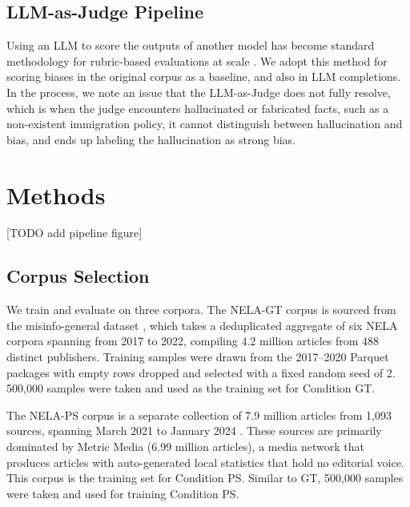 \documentclass{article}
\begin{document}
\subsection{LLM-as-Judge Pipeline}
Using an LLM to score the outputs of another model has become standard methodology for rubric-based evaluations at scale \cite{zheng2023judge}. 
We adopt this method for scoring biases in the original corpus as a baseline, and also in LLM completions.  
In the process, we note an issue that the LLM-as-Judge does not fully resolve, which is when the judge encounters hallucinated or fabricated facts, such as a non-existent immigration policy, it cannot distinguish between hallucination and bias, and ends up labeling the hallucination as strong bias. 

\section{Methods}

[TODO add pipeline figure]

\subsection{Corpus Selection}
We train and evaluate on three corpora. The NELA-GT corpus is sourced from the misinfo-general 
dataset \cite{verhoeven2024}, which takes a deduplicated aggregate of six NELA corpora \cite{gruppi2023nela} spanning
from 2017 to 2022, compiling $4.2$ million articles from 488 distinct publishers. Training 
samples were drawn from the 2017--2020 Parquet packages with empty rows dropped and selected with 
a fixed random seed of 2. 500{,}000 samples were taken and used as the training set for Condition GT. 

The NELA-PS corpus is a separate collection of 7.9 million articles from 1{,}093 sources, spanning
March 2021 to January 2024 \cite{horne2024nelaps}. These sources are primarily dominated by Metric Media (6.99 million articles), a media 
network that produces articles with auto-generated local statistics that hold no editorial voice. This corpus is the training set for Condition PS. 
Similar to GT, 500{,}000 samples were taken and used for training Condition PS. 
\end{document}
